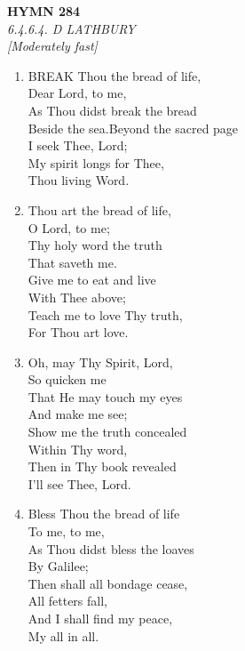 \newpage
\begin{center}
    {\Large \textbf{HYMN 284}}
    \\
    \textit{6.4.6.4. D LATHBURY}
    \\
    \textit{\small [Moderately fast]}
\end{center}
\vspace{1em}

\begin{enumerate}
    \item BREAK Thou the bread of life, \\
        Dear Lord, to me, \\
        As Thou didst break the bread \\
        Beside the sea.Beyond the sacred page \\
        I seek Thee, Lord; \\
        My spirit longs for Thee, \\
        Thou living Word.

    \item Thou art the bread of life, \\
        O Lord, to me; \\
        Thy holy word the truth \\
        That saveth me. \\
        Give me to eat and live \\
        With Thee above; \\
        Teach me to love Thy truth, \\
        For Thou art love.

    \item Oh, may Thy Spirit, Lord, \\
        So quicken me \\
        That He may touch my eyes \\
        And make me see; \\
        Show me the truth concealed \\
        Within Thy word, \\
        Then in Thy book revealed \\
        I'll see Thee, Lord.

    \item Bless Thou the bread of life \\
        To me, to me, \\
        As Thou didst bless the loaves \\
        By Galilee; \\
        Then shall all bondage cease, \\
        All fetters fall, \\
        And I shall find my peace, \\
        My all in all.

\end{enumerate}

